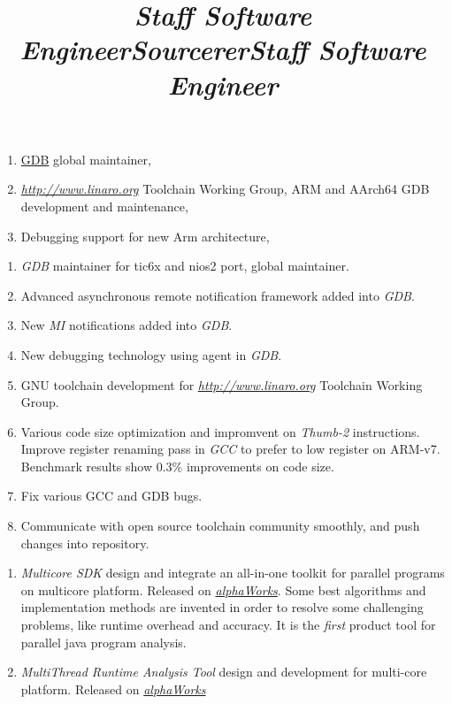 \begin{resume}
\title{\emph{Staff Software Engineer}}
\begin{position}
  \begin{enumerate}
    \item[] \href{https://sourceware.org/gdb}{GDB} global maintainer,
  \item[] \href{http://www.linaro.org}{\emph{http://www.linaro.org}} Toolchain Working Group, ARM and AArch64 GDB development and maintenance,
  \item[] Debugging support for new Arm architecture,
  \end{enumerate}
\end{position}

\title{\emph{Sourcerer}}
\begin{position}
\begin{enumerate}
\item[] \emph{GDB} maintainer for tic6x and nios2 port, global maintainer.
\item[] Advanced asynchronous remote notification framework added into \emph{GDB}.
\item[] New \emph{MI} notifications added into \emph{GDB}.
\item[] New debugging technology using agent in \emph{GDB}.
\item[] GNU toolchain development for \href{http://www.linaro.org}{\emph{http://www.linaro.org}} Toolchain Working Group.
\item[] Various code size optimization and impromvent on \emph{Thumb-2} instructions.  Improve register renaming pass in \emph{GCC} to prefer to low register on ARM-v7.  Benchmark results show 0.3\% improvements on code size.
\item[] Fix various GCC and GDB bugs.
\item[] Communicate with open source toolchain community smoothly, and push changes into repository.
\end{enumerate}
\end{position}

\title{\emph{Staff Software Engineer}}
\begin{position}
\begin{enumerate}
\item[] \emph{Multicore SDK} design and integrate an all-in-one toolkit for parallel programs on multicore platform.  Released on \href{http://www.alphaworks.ibm.com/tech/msdk}{\emph{alphaWorks}}.  Some best algorithms and implementation methods are invented in order to resolve some challenging problems, like runtime overhead and accuracy.  It is the \emph{first} product tool for parallel java program analysis.
\item[] \emph{MultiThread Runtime Analysis Tool} design and development for multi-core platform.  Released on \href{http://www.alphaworks.ibm.com/tech/mtrat}{\emph{alphaWorks}}


\end{enumerate}
\end{position}
\end{resume}
